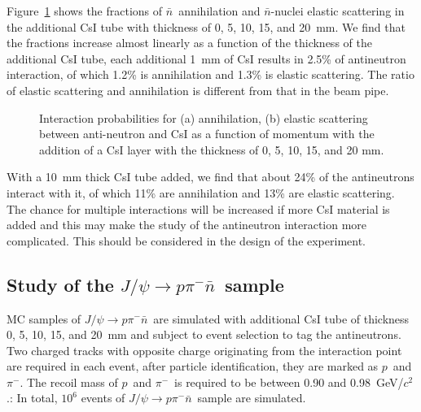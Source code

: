 \documentclass[aps,preprint,showkeys,superscriptaddress]{revtex4}
\newcommand{\pp}{$p$}
\newcommand{\pim}{$\pi^-$}
\newcommand{\nbar}{$\bar{n}$}
\begin{document}
Figure~\ref{fig:fraction_nbar} shows the fractions of \nbar\ annihilation and
\nbar-nuclei elastic scattering in the additional CsI tube with thickness of 0,
5, 10, 15, and 20~mm. We find that the fractions increase almost linearly as a
function of the thickness of the additional CsI tube, each additional 1~mm of
CsI results in 2.5\% of antineutron interaction, of which 1.2\% is
annihilation and 1.3\% is elastic scattering. The ratio of elastic scattering
and annihilation is different from that in the beam pipe. 
        
        \begin{figure}[htbp]
        	\centering  %
        	\subfigbottomskip=2pt %
        	\subfigcapskip=-5pt %
        	\caption{
Interaction probabilities for (a) annihilation, (b) elastic scattering between
anti-neutron and CsI as a function of momentum with the addition of a CsI layer with the
thickness of 0, 5, 10, 15, and 20 mm. }

        	\label{fig:fraction_nbar}
        \end{figure}

With a 10~mm thick CsI tube added, we find that about 24\% of the antineutrons
interact with it, of which 11\% are annihilation and 13\% are elastic
scattering. The chance for multiple interactions will be increased if more CsI
material is added and this may make the study of the antineutron interaction
more complicated. This should be considered in the design of the experiment. 

\subsection{\boldmath Study of the $J/\psi\to $\pp\pim\nbar~sample}

MC samples of $J/\psi\to $\pp\pim\nbar\ are simulated with additional CsI tube
of thickness 0, 5, 10, 15, and 20~mm and subject to event selection to tag the
antineutrons. Two charged tracks with opposite charge originating from the
interaction point are required in each event, after particle identification,
they are marked as \pp\ and \pim. The recoil mass of \pp\ and \pim\ is required
to be between 0.90 and 0.98~GeV/$c^2$.:
In total, $10^6$ events of $J/\psi\to
$\pp\pim\nbar\ sample are simulated. 
%
\end{document}
